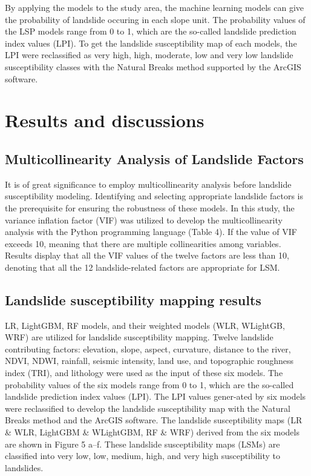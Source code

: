 \documentclass[a4paper,fleqn]{cas-sc}
\begin{document}
By applying the models to the study area, the machine learning models can give the probability of landslide occuring in each slope unit. 
The probability values of the LSP models range from 0 to 1, which are the so-called landslide prediction index values (LPI). 
To get the landslide susceptibility map of each models, the LPI were reclassified as very high, high, moderate, low and very low landslide susceptibility classes with the Natural Breaks method supported by the ArcGIS software. 

\section{Results and discussions}
\subsection{Multicollinearity Analysis of Landslide Factors}

It is of great significance to employ multicollinearity analysis before landslide susceptibility modeling. 
Identifying and selecting appropriate landslide factors is the prerequisite for ensuring the robustness of these models. 
In this study, the variance inflation factor (VIF) was utilized to develop the multicollinearity analysis with the Python programming language (Table 4). 
If the value of VIF exceeds 10, meaning that there are multiple collinearities among variables. 
Results display that all the VIF values of the twelve factors are less than 10, denoting that all the 12 landslide-related factors are appropriate for LSM.

\subsection{Landslide susceptibility mapping results}

LR, LightGBM, RF models, and their weighted models (WLR, WLightGB, WRF) are utilized for landslide susceptibility mapping. 
Twelve landslide contributing factors: elevation, slope, aspect, curvature, distance to the river, NDVI, NDWI, rainfall, seismic intensity, land use, and topographic roughness index (TRI), and lithology were used as the input of these six models. 
The probability values of the six models range from 0 to 1, which are the so-called landslide prediction index values (LPI). 
The LPI values gener-ated by six models were reclassified to develop the landslide susceptibility map with the Natural Breaks method and the ArcGIS software. 
The landslide susceptibility maps (LR \& WLR, LightGBM \& WLightGBM, RF \& WRF) derived from the six models are shown in Figure 5 a–f. 
These landslide susceptibility maps (LSMs) are classified into very low, low, medium, high, and very high susceptibility to landslides. 
\end{document}
